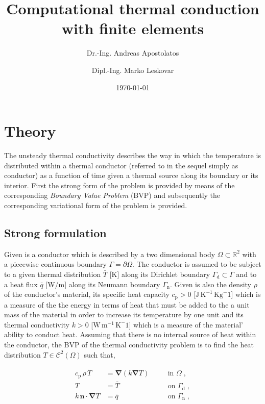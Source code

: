 \documentclass[10pt,a4paper]{article}
\title{Computational thermal conduction with finite elements}
\author{Dr.-Ing. Andreas Apostolatos \and Dipl.-Ing. Marko Leskovar}
\date{\today}
\begin{document}
\maketitle

\section{Theory}\label{sec:theory}

The unsteady thermal conductivity describes the way in which the temperature is distributed within a thermal conductor (referred to in the sequel simply as conductor) as a function of time given a thermal source along its boundary or its interior. First the strong form of the problem is provided by means of the corresponding \textit{Boundary Value Problem} (BVP) and subsequently the corresponding variational form of the problem is provided.

\subsection{Strong formulation}\label{subsec:strong_formulation}

Given is a conductor which is described by a two dimensional body $\Omega \subset \mathbb{R}^2$ with a piecewise continuous boundary $\Gamma = \partial \Omega$. The conductor is assumed to be subject to a given thermal distribution $\bar{T}$ [K] along its Dirichlet boundary $\Gamma_{\text{d}} \subset \Gamma$ and to a heat flux $\bar{q}$ [W/m] along its Neumann boundary $\Gamma_{\text{n}}$. Given is also the density $\rho$ of the conductor's material, its specific heat capacity $c_{\text{p}} > 0$ [$\text{J} \, \text{K}^{-1} \, \text{Kg}^-1$] which is a measure of the the energy in terms of heat that must be added to the a unit mass of the material in order to increase its temperature by one unit and its thermal conductivity $k > 0$ [$\text{W} \, \text{m}^{-1} \, \text{K}^-1$] which is a measure of the material' ability to conduct heat. Assuming that there is no internal source of heat within the conductor, the BVP of the thermal conductivity problem is to find the heat distribution $T \in \mathcal{C}^2(\Omega)$ such that,

\begin{subequations}
	\begin{alignat}{2}
		c_{\text{p}} \, \rho \, \dot{T} &= \boldsymbol{\nabla} (k\boldsymbol{\nabla} T) \quad &&\text{in }\Omega\;, \label{eq:thermal_conduction} \\
		T &= \bar{T} \; &&\text{on } \Gamma_{\text{d}} \;, \label{eq:boundary_dirichlet} \\
		k \, \mathbf{n} \cdot \boldsymbol{\nabla} T &= \bar{q} \label{eq:boundary_flux} \; &&\text{on } \Gamma_{\text{n}} \;,
	\end{alignat}
	\label{eq:thermal_conduction_bvp}
\end{subequations}
\end{document}
